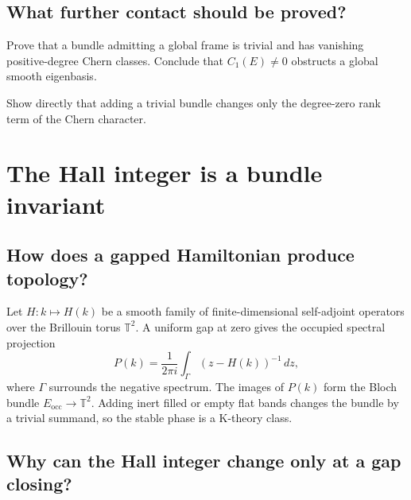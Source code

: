 \section{What further contact should be proved?}

\begin{exercise}
Prove that a bundle admitting a global frame is trivial and has vanishing
positive-degree Chern classes.  Conclude that $C_1(E)\ne0$ obstructs a global
smooth eigenbasis.
\end{exercise}

\begin{exercise}
Show directly that adding a trivial bundle changes only the degree-zero rank
term of the Chern character.
\end{exercise}


\chapter{The Hall integer is a bundle invariant}
\label{ch:hall}



\section{How does a gapped Hamiltonian produce topology?}

Let $H:k\mapsto H(k)$ be a smooth family of finite-dimensional self-adjoint
operators over the Brillouin torus $\mathbb T^2$.  A uniform gap at zero gives
the occupied spectral projection
\[
P(k)=\frac{1}{2\pi i}\int_\Gamma(z-H(k))^{-1}\,dz,
\]
where $\Gamma$ surrounds the negative spectrum.  The images of $P(k)$ form
the Bloch bundle $E_{\mathrm{occ}}\to\mathbb T^2$.  Adding inert filled or
empty flat bands changes the bundle by a trivial summand, so the stable phase
is a K-theory class.

\section{Why can the Hall integer change only at a gap closing?}

